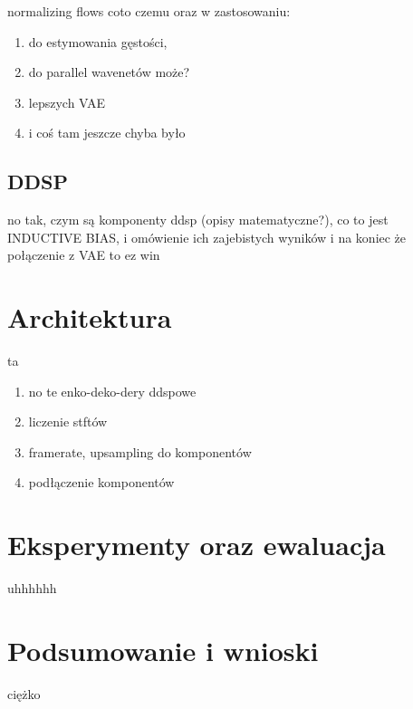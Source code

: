 \documentclass[magisterska]{pracamgr}
\begin{document}
normalizing flows coto czemu oraz w zastosowaniu:
\begin{enumerate}
    \setlength\itemsep{0em}
    \item do estymowania gęstości,
    \item do parallel wavenetów może?
    \item lepszych VAE
    \item i coś tam jeszcze chyba było
\end{enumerate}

\section{DDSP}

no tak, czym są komponenty ddsp (opisy matematyczne?), co to jest INDUCTIVE BIAS, i omówienie ich zajebistych wyników i na koniec że połączenie z VAE to ez win

\chapter{Architektura}

ta
\begin{enumerate}
    \item no te enko-deko-dery ddspowe
    \item liczenie stftów
    \item framerate, upsampling do komponentów
    \item podłączenie komponentów
\end{enumerate}

\chapter{Eksperymenty oraz ewaluacja}

uhhhhhh

\chapter{Podsumowanie i wnioski}

ciężko


\end{document}
